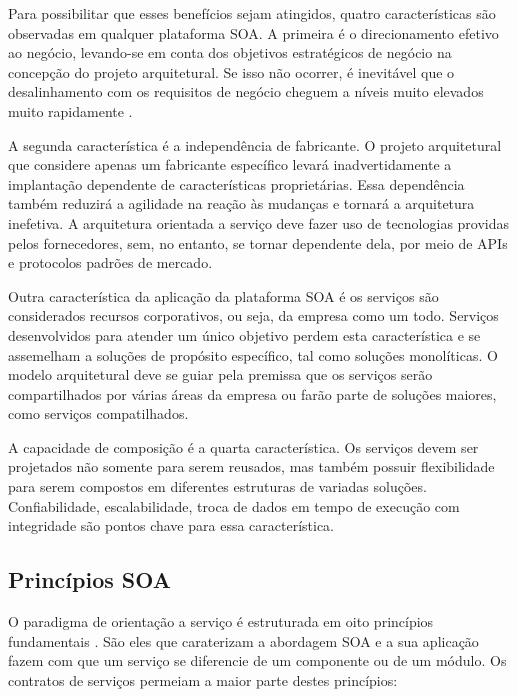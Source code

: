 Para possibilitar que esses benefícios sejam atingidos, quatro características
são observadas em qualquer plataforma SOA. A primeira é o direcionamento
efetivo ao negócio, levando-se em conta dos objetivos estratégicos de negócio na
concepção do projeto arquitetural. Se isso não ocorrer, é inevitável que o
desalinhamento com os requisitos de negócio cheguem a níveis muito elevados
muito rapidamente \cite{erl2008soaDesigPatterns}.

A segunda característica é a independência de fabricante. O projeto arquitetural
que considere apenas um fabricante específico levará inadvertidamente a
implantação dependente de características proprietárias. Essa dependência também
reduzirá a agilidade na reação às mudanças e tornará a arquitetura inefetiva. A
arquitetura orientada a serviço deve fazer uso de tecnologias providas pelos
fornecedores, sem, no entanto, se tornar dependente dela, por meio de APIs e
protocolos padrões de mercado.

Outra característica da aplicação da plataforma SOA é os serviços são
considerados recursos corporativos, ou seja, da empresa como um todo. Serviços
desenvolvidos para atender um único objetivo perdem esta característica e se
assemelham a soluções de propósito específico, tal como soluções monolíticas. O
modelo arquitetural deve se guiar pela premissa que os serviços serão
compartilhados por várias áreas da empresa ou farão parte de soluções maiores,
como serviços compatilhados.

A capacidade de composição é a quarta característica. Os serviços devem ser
projetados não somente para serem reusados, mas também possuir
flexibilidade para serem compostos em diferentes estruturas de variadas
soluções. Confiabilidade, escalabilidade, troca de dados em tempo de execução
com integridade são pontos chave para essa característica.



\subsection{Princípios SOA}
\label{PrincipiosSOA} 
\vspace{-6mm}

O paradigma de orientação a serviço é estruturada em oito princípios
fundamentais \cite{erl2009web}. São eles que caraterizam a abordagem SOA e a sua
aplicação fazem com que um serviço se diferencie de um componente ou de
um módulo.
Os contratos de serviços permeiam a maior parte destes princípios:

